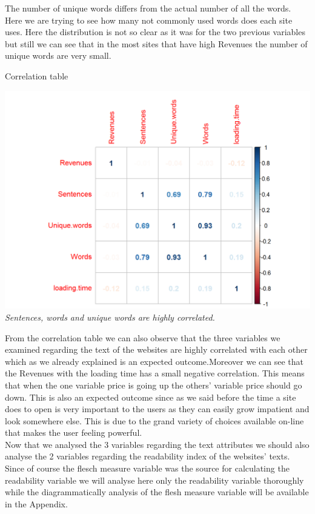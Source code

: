 \documentclass{article}
\begin{document}
The number of unique words differs from the actual number of all the words. Here we are trying to see how many not commonly used words does each site uses. Here the distribution is not so clear as it was for the two previous variables but still we can see that in the most sites that have high Revenues the number of unique words are very small. 
\begin{table}[H]
\centering
\caption{Correlation table}
\begin{center}
\includegraphics[scale=0.5]{../R/photos/38_words_corr.png}    \\
\textit{Sentences, words and unique words are highly correlated.}
\end{center}
\end{table}
From the correlation table we can also observe that the three variables we examined regarding the text of the websites are highly correlated with each other which as we already explained is an expected outcome.Moreover we can see that the Revenues with the loading time has a small negative correlation. This means that when the one variable price is going up the others' variable price should go down. This is also an expected outcome since as we said before the time a site does to open is very important to the users as they can easily grow impatient and look somewhere else. This is due to the grand variety of choices available on-line that makes the user feeling powerful.\\
Now that we analysed the 3 variables regarding the text attributes we should also analyse the 2 variables regarding the readability index of the websites' texts. Since of course the flesch measure variable was the source for calculating the readability variable we will analyse here only the readability variable thoroughly while the diagrammatically analysis of the flesh measure variable will be available in the Appendix.
\end{document}
